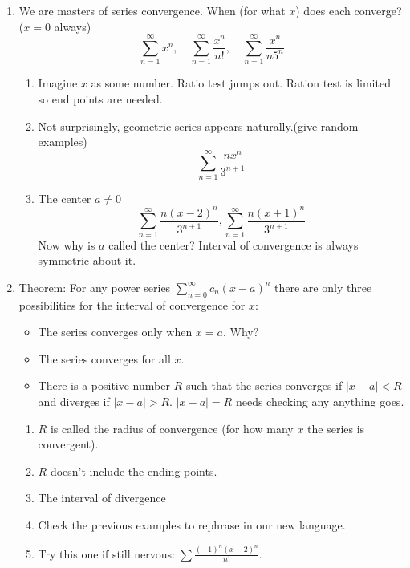 \documentclass{article}
\begin{document}
\begin{enumerate}
\item We are masters of series convergence. When (for what $x$) does each converge? ($x=0$ always)
$$
\sum_{n=1}^\infty x^n, \quad \sum_{n=1}^\infty \frac{x^n}{n!},\quad \sum_{n=1}^\infty\frac{x^n}{n5^n}
$$

\begin{enumerate}
\item Imagine $x$ as some number. Ratio test jumps out. Ration test is limited so end points are needed.
\item Not surprisingly, geometric series appears naturally.(give random examples)
$$
\sum_{n=1}^\infty \frac{nx^n}{3^{n+1}}
$$
\item The center $a \neq 0$
$$
\sum_{n=1}^\infty \frac{n(x-2)^n}{3^{n+1}}, \sum_{n=1}^\infty \frac{n(x+1)^n}{3^{n+1}}
$$
Now why is $a$ called the center? Interval of convergence is always symmetric about it.
\end{enumerate}

\item Theorem: For any power series $\displaystyle \sum_{n=0}^\infty c_n(x-a)^n$ there are only three possibilities for the interval of convergence for $x$:
\begin{itemize}
\item The series converges only when $x=a$. Why?
\item The series converges for all $x$.
\item There is a positive number $R$ such that the series converges if $|x-a|<R$ and diverges if $|x-a|>R$. $|x-a|=R$ needs checking any anything goes.
\end{itemize}
\begin{enumerate}

\item $R$ is called the radius of convergence (for how many $x$ the series is convergent).
\item $R$ doesn't include the ending points.
\item The interval of divergence 
\item Check the previous examples to rephrase in our new language.
\item Try this one if still nervous: $\sum \frac{(-1)^n(x-2)^n}{n!}$.
\end{enumerate}


\end{enumerate}
\end{document}
